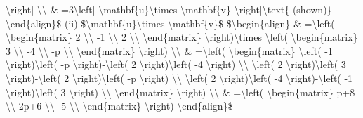 \textbackslash right| \textbackslash\textbackslash{} \& =3\textbackslash left|
\textbackslash mathbf\{u\}\textbackslash times \textbackslash mathbf\{v\}
\textbackslash right|\textbackslash text\{ (shown)\} \textbackslash end\{align\}\$
(ii) \$\textbackslash mathbf\{u\}\textbackslash times \textbackslash mathbf\{v\}\$
\$\textbackslash begin\{align\} \& =\textbackslash left( \textbackslash begin\{matrix\}
2 \textbackslash\textbackslash{} -1 \textbackslash\textbackslash{}
2 \textbackslash\textbackslash{} \textbackslash end\{matrix\} \textbackslash right)\textbackslash times
\textbackslash left( \textbackslash begin\{matrix\} 3 \textbackslash\textbackslash{}
-4 \textbackslash\textbackslash{} -p \textbackslash\textbackslash{}
\textbackslash end\{matrix\} \textbackslash right) \textbackslash\textbackslash{}
\& =\textbackslash left( \textbackslash begin\{matrix\} \textbackslash left(
-1 \textbackslash right)\textbackslash left( -p \textbackslash right)-\textbackslash left(
2 \textbackslash right)\textbackslash left( -4 \textbackslash right)
\textbackslash\textbackslash{} \textbackslash left( 2 \textbackslash right)\textbackslash left(
3 \textbackslash right)-\textbackslash left( 2 \textbackslash right)\textbackslash left(
-p \textbackslash right) \textbackslash\textbackslash{} \textbackslash left(
2 \textbackslash right)\textbackslash left( -4 \textbackslash right)-\textbackslash left(
-1 \textbackslash right)\textbackslash left( 3 \textbackslash right)
\textbackslash\textbackslash{} \textbackslash end\{matrix\} \textbackslash right)
\textbackslash\textbackslash{} \& =\textbackslash left( \textbackslash begin\{matrix\}
p+8 \textbackslash\textbackslash{} 2p+6 \textbackslash\textbackslash{}
-5 \textbackslash\textbackslash{} \textbackslash end\{matrix\}
\textbackslash right) \textbackslash end\{align\}\$

